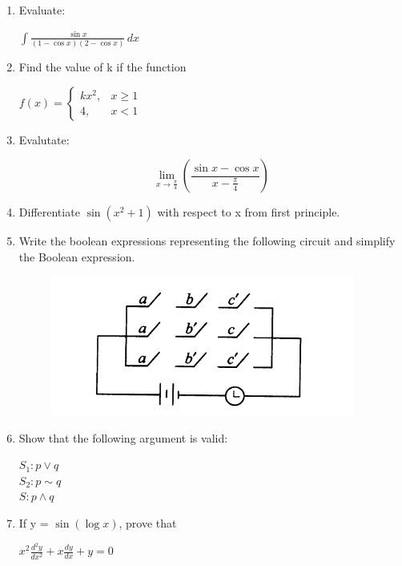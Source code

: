 \documentclass[journal,12pt,twocolumn]{IEEEtran}
\begin{document}
\begin{enumerate}
\begin{center}
\end{center}
\item Evaluate: 
\begin{center}
    $ \int \displaystyle\frac{\sin x}{(1-\cos x)(2-\cos x)}\, dx $
\end{center} 
\item Find the value of k if the function
\begin{center}
   $ f(x) =
   \left\{
\begin{array}{ll}
      kx^2, & x\geq 1 \\
      4, & x <  1 
\end{array} \right. $
\end{center}

 \item Evalutate: 
 \begin{center}
   \[ \lim_{x\to\frac{\pi}{4}} \left(\displaystyle\frac{\sin x - \cos x}{x - \displaystyle\frac{\pi}{4}}\right) \]
 \end{center}
 
 \item Differentiate  $ \sin (x^2 + 1) $ with respect to x from first principle.

 \item Write the boolean expressions representing the following circuit and simplify the Boolean expression.
 \begin{figure}[H]
   \centering
   \includegraphics[width=10cm]{1.png}
\end{figure}

 \item Show that the following argument is valid:
 \begin{center}
    $ S_1 : p \vee q $  \\
   $ S_2 : p \sim q $ \\
    $ S : p \wedge q $ 
 \end{center}

 \item If y = $\sin(\log x)$, prove that
 \begin{center}
    $ x^2\displaystyle\frac{d^2y}{dx^2} + x\displaystyle\frac{dy}{dx} + y = 0$
 \end{center}


\end{enumerate}
\end{document}
